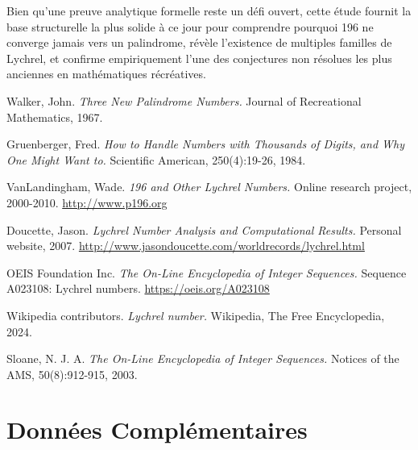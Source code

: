 \documentclass[12pt,a4paper]{article}
\theoremstyle{remark}
\begin{document}
Bien qu'une preuve analytique formelle reste un défi ouvert, cette étude fournit la base structurelle la plus solide à ce jour pour comprendre pourquoi 196 ne converge jamais vers un palindrome, révèle l'existence de multiples familles de Lychrel, et confirme empiriquement l'une des conjectures non résolues les plus anciennes en mathématiques récréatives.


\begin{thebibliography}{99}

Walker, John.
\textit{Three New Palindrome Numbers.}
Journal of Recreational Mathematics, 1967.

Gruenberger, Fred.
\textit{How to Handle Numbers with Thousands of Digits, and Why One Might Want to.}
Scientific American, 250(4):19-26, 1984.

VanLandingham, Wade.
\textit{196 and Other Lychrel Numbers.}
Online research project, 2000-2010.
\url{http://www.p196.org}

Doucette, Jason.
\textit{Lychrel Number Analysis and Computational Results.}
Personal website, 2007.
\url{http://www.jasondoucette.com/worldrecords/lychrel.html}

OEIS Foundation Inc.
\textit{The On-Line Encyclopedia of Integer Sequences.}
Sequence A023108: Lychrel numbers.
\url{https://oeis.org/A023108}

Wikipedia contributors.
\textit{Lychrel number.}
Wikipedia, The Free Encyclopedia, 2024.

Sloane, N. J. A.
\textit{The On-Line Encyclopedia of Integer Sequences.}
Notices of the AMS, 50(8):912-915, 2003.

\end{thebibliography}


\appendix

\section{Données Complémentaires}
\label{app:donnees}
\end{document}
